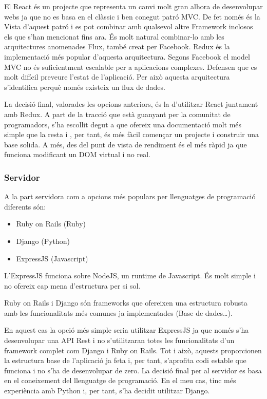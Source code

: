 \documentclass[12pt, titlepage]{article}
\begin{document}
El React és un projecte que representa un canvi molt gran alhora de desenvolupar
webs ja que no es basa en el clàssic i ben conegut patró MVC. De fet només és la
Vista d’aquest patró i es pot combinar amb qualsevol altre Framework inclosos els
que s’han mencionat fins ara. És molt natural combinar-lo amb les
arquitectures anomenades Flux, també creat per Facebook. Redux és la implementació
més popular d’aquesta arquitectura. Segons Facebook el model MVC no és
suficientment escalable per a aplicacions complexes. Defensen que es molt
difícil preveure l’estat de l’aplicació. Per això aquesta arquitectura
s’identifica perquè només existeix un flux de dades.

La decisió final, valorades les opcions anteriors, és la d’utilitzar React juntament
amb Redux. A part de la tracció que està guanyant per la comunitat de programadors,
s’ha escollit degut a que ofereix una documentació molt més simple que la resta i
, per tant, és més fàcil començar un projecte i construir una base solida. A més,
des del punt de vista de rendiment és el més ràpid ja que funciona modificant un
DOM virtual i no real.

\subsubsection{Servidor}
A la part servidora com a opcions més populars per llenguatges de programació diferents són:

\begin{itemize}
\item Ruby on Rails (Ruby)
\item Django (Python)
\item ExpressJS (Javascript)
\end{itemize}

L’ExpressJS funciona sobre NodeJS, un runtime de Javascript. És molt simple i no
ofereix cap mena d’estructura per si sol.

Ruby on Rails i Django són frameworks que ofereixen una estructura robusta amb
les funcionalitats més comunes ja implementades (Base de dades…).

En aquest cas la opció més simple seria utilitzar ExpressJS ja que només s’ha
desenvolupar una API Rest i no s’utilitzaran totes les funcionalitats d’un framework
complet com Django i Ruby on Rails. Tot i això, aquests proporcionen la estructura
base de l’aplicació ja feta i, per tant, s’aprofita codi estable que funciona i no
s’ha de desenvolupar de zero. La decisió final per al servidor es basa en el
coneixement del llenguatge de programació. En el meu cas, tinc més experiència
amb Python i, per tant, s’ha decidit utilitzar Django.
\end{document}
